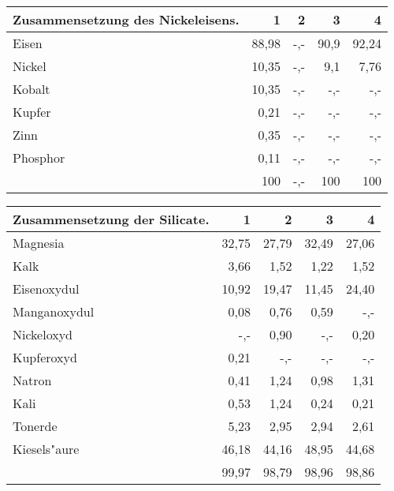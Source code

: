 \documentclass[a4paper, 11pt, oneside]{article}
\begin{document}
\vspace{\medskipamount}
\begin{center}
\begin{tabular}{ |l|r|r|r|r| }
    \hline
    Zusammensetzung des Nickeleisens. & 1 & 2 & 3 & 4\\
    \hline\hline
    Eisen & 88,98 & -,- & 90,9 & 92,24\\\hline
    Nickel & 10,35 & -,- & 9,1 & 7,76\\\hline
    Kobalt & 10,35 & -,- & -,- & -,-\\\hline
    Kupfer & 0,21 & -,- & -,- & -,-\\\hline
    Zinn & 0,35 & -,- & -,- & -,-\\\hline
    Phosphor & 0,11 & -,- & -,- & -,-\\\hline
     & 100 & -,- & 100 & 100\\
    \hline
\end{tabular}
\end{center}
\vspace{\medskipamount}
\begin{center}
\begin{tabular}{ |l|r|r|r|r| }
    \hline
    Zusammensetzung der Silicate. & 1 & 2 & 3 & 4\\
    \hline\hline
    Magnesia & 32,75 & 27,79 & 32,49 & 27,06\\\hline
    Kalk & 3,66 & 1,52 & 1,22 & 1,52\\\hline
    Eisenoxydul & 10,92 & 19,47 & 11,45 & 24,40\\\hline
    Manganoxydul & 0,08 & 0,76 & 0,59 & -,-\\\hline
    Nickeloxyd & -,- & 0,90 & -,- & 0,20\\\hline
    Kupferoxyd & 0,21 & -,- & -,- & -,-\\\hline
    Natron & 0,41 & 1,24 & 0,98 & 1,31\\\hline
    Kali & 0,53 & 1,24 & 0,24 & 0,21\\\hline
    Tonerde & 5,23 & 2,95 & 2,94 & 2,61\\\hline
    Kiesels"aure & 46,18 & 44,16 & 48,95 & 44,68\\\hline
     & 99,97 & 98,79 & 98,96 & 98,86\\
    \hline
\end{tabular}
\end{center}
\end{document}
